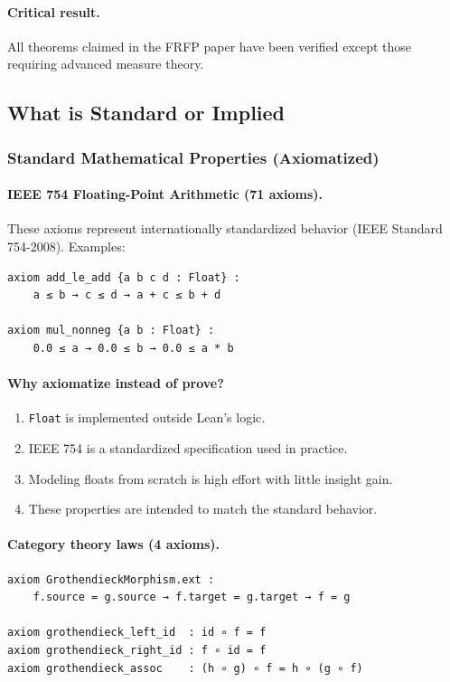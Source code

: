 \paragraph{Critical result.}
All theorems claimed in the FRFP paper have been verified except those requiring advanced measure theory.

\subsection{What is Standard or Implied}

\subsubsection{Standard Mathematical Properties (Axiomatized)}

\paragraph{IEEE 754 Floating-Point Arithmetic (71 axioms).}
These axioms represent internationally standardized behavior (IEEE Standard 754-2008).
Examples:
\begin{verbatim}
axiom add_le_add {a b c d : Float} :
    a ≤ b → c ≤ d → a + c ≤ b + d

axiom mul_nonneg {a b : Float} :
    0.0 ≤ a → 0.0 ≤ b → 0.0 ≤ a * b
\end{verbatim}

\paragraph{Why axiomatize instead of prove?}
\begin{enumerate}
  \item \texttt{Float} is implemented outside Lean's logic.
  \item IEEE 754 is a standardized specification used in practice.
  \item Modeling floats from scratch is high effort with little insight gain.
  \item These properties are intended to match the standard behavior.
\end{enumerate}

\paragraph{Category theory laws (4 axioms).}
\begin{verbatim}
axiom GrothendieckMorphism.ext :
    f.source = g.source → f.target = g.target → f = g

axiom grothendieck_left_id  : id ∘ f = f
axiom grothendieck_right_id : f ∘ id = f
axiom grothendieck_assoc    : (h ∘ g) ∘ f = h ∘ (g ∘ f)
\end{verbatim}

